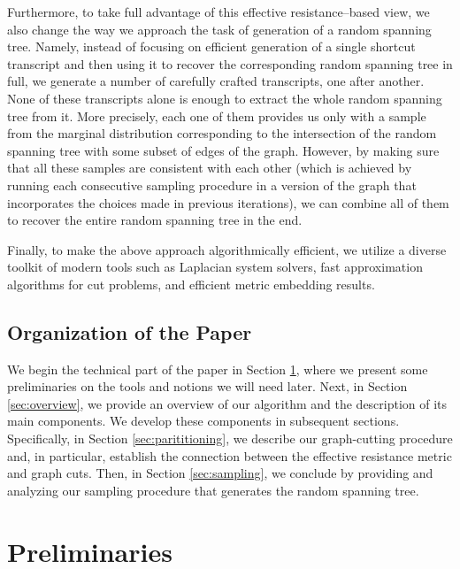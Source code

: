 \documentclass[11pt, letterpaper]{article}
\begin{document}
Furthermore, to take full advantage of this effective resistance--based view, we also change the way we approach the task of generation of a random spanning tree. Namely, instead of focusing on efficient generation of a single shortcut transcript and then using it to recover the corresponding random spanning tree in full, we generate a number of carefully crafted transcripts, one after another. None of these transcripts alone is enough to extract the whole random spanning tree from it. More precisely, each one of them provides us only with a sample from the marginal distribution corresponding to the intersection of the random spanning tree with some subset of edges of the graph. However, by making sure that all these samples are consistent with each other (which is achieved by running each consecutive sampling procedure in a version of the graph that incorporates the choices made in previous iterations), we can combine all of them to recover the entire random spanning tree in the end. 
 
Finally, to make the above approach algorithmically efficient, we utilize a diverse toolkit of modern tools such as Laplacian system solvers, fast approximation algorithms for cut problems, and efficient metric embedding results. 
 
 
   




\subsection{Organization of the Paper}
We begin the technical part of the paper in Section \ref{sec:preliminaries}, where we present some preliminaries on the tools and notions we will need later. Next, in Section \ref{sec:overview}, we provide an overview of our algorithm and the description of its main components. We develop these components in subsequent sections. Specifically, in Section \ref{sec:parititioning}, we describe our graph-cutting procedure and, in particular, establish the connection between the effective resistance metric and graph cuts. Then, in Section \ref{sec:sampling}, we conclude by providing and analyzing our sampling procedure that generates the random spanning tree.
  
  









   \section{Preliminaries} \label{sec:preliminaries}
 
\end{document}
